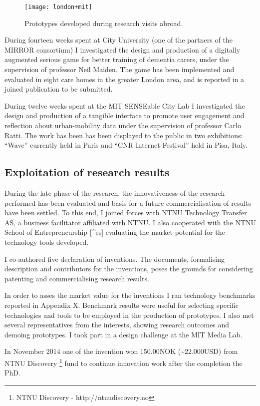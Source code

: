 \begin{figure}[tbh]
    \centering
    \texttt{[image: london+mit]}
    \caption{Prototypes developed during research visits abroad.}
    \label{fig:research-abroad}
\end{figure}

During fourteen weeks spent at City University (one of the partners of
the MIRROR consortium) I investigated the design and production of a
digitally augmented serious game for better training of dementia carers,
under the supervision of professor Neil Maiden. The game has been
implemented and evaluated in eight care homes in the greater London
area, and is reported in a joined publication to be submitted.

During twelve weeks spent at the MIT SENSEable City Lab I investigated
the design and production of a tangible interface to promote user
engagement and reflection about urban-mobility data under the
supervision of professor Carlo Ratti. The work has been has been
displayed to the public in two exhibitions: ``Wave'' currently held in
Paris and ``CNR Internet Festival'' held in Pisa,
Italy.

\subsection{Exploitation of research
results}\label{exploitation-of-research-results}

During the late phase of the research, the innovativeness of the
research performed has been evaluated and basis for a future
commercialisation of results have been settled. To this end, I joined
forces with NTNU Technology Transfer AS, a business facilitator
affiliated with NTNU. I also cooperated with the NTNU School of
Entrepreneurship {[}\^{}es{]} evaluating the market potential for the
technology tools developed.

I co-authored five declaration of inventions. The documents, formalising
description and contributors for the inventions, poses the grounds for
considering patenting and commercialising research results.

In order to asses the market value for the inventions I ran technology
benchmarks reported in Appendix
X. Benchmark
results were useful for selecting specific technologies and tools to be
employed in the production of prototypes. I also met several
representatives from the interests, showing research outcomes and
demoing prototypes. I took part in a design challenge at the MIT Media
Lab.

In November 2014 one of the invention won 150.00NOK
(\textasciitilde{}22.000USD) from NTNU Discovery \footnote{NTNU
  Discovery - http://ntnudiscovery.no} fund to continue innovation work
after the completion the PhD.
